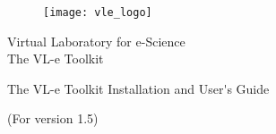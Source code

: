 %
% 

\begin{center}
\begin{figure}[htbp]
\centerline{\texttt{[image: vle\_logo]}}
\end{figure}

\vspace{5cm} 

{\Large Virtual Laboratory for e-Science}\\
{\Large The VL-e Toolkit}\\ 

\vspace{1cm} 
 
{\Huge The VL-e Toolkit Installation and User\'{}s Guide}\\ 

\vspace{1cm} 

{(For version 1.5)}\\
\vspace{0.5cm} 
\vspace{0.5cm} 

\\
\\
\end{center}

